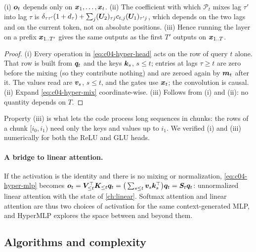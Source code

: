 \begin{proposition}\label{prop:c04-hyper-causal}
(i) $\bm{o}_t$ depends only on $\bm{x}_1,\dots,\bm{x}_t$. (ii) The coefficient with which $\mathcal{P}_t$ mixes
lag $\tau'$ into lag $\tau$ is $\delta_{\tau\tau'}(1+d_\tau)+\sum_{j}(\bm{U}_2)_{\tau j}c_{t,j}(\bm{U}_1)_{\tau' j}$,
which depends on the two lags and on the current token, not on absolute positions. (iii) Hence
running the layer on a prefix $\bm{x}_{1..T'}$ gives the same outputs as the first $T'$ outputs on
$\bm{x}_{1..T}$.
\end{proposition}
\begin{proof}
(i) Every operation in \eqref{eq:c04-hyper-head} acts on the row of query $t$ alone. That row is
built from $\bm{q}_t$ and the keys $\bm{k}_s$, $s\le t$; entries at lags $\tau\ge t$ are zero before the
mixing (so they contribute nothing) and are zeroed again by $\bm{m}_t$ after it. The values read are
$\bm{v}_s$, $s\le t$, and the gates use $\bm{x}_t$; the convolution is causal. (ii) Expand
\eqref{eq:c04-hyper-mix} coordinate-wise. (iii) Follows from (i) and (ii): no quantity depends on
$T$.
\end{proof}

Property (iii) is what lets the code process long sequences in chunks: the rows of a chunk
$[i_0,i_1)$ need only the keys and values up to $i_1$. We verified (i) and (iii) numerically for
both the ReLU and GLU heads.

\paragraph{A bridge to linear attention.}
If the activation is the identity and there is no mixing or normalization,
\eqref{eq:c04-hyper-mlp} becomes $\bm{o}_t=\bm{V}_{\le t}^{\top}\bm{K}_{\le t}\bm{q}_t=\big(\sum_{s\le t}\bm{v}_s\bm{k}_s^{\top}\big)\bm{q}_t
=\bm{S}_t\bm{q}_t$: unnormalized linear attention with the state of \cref{ch:linear}. Softmax attention and
linear attention are thus two choices of activation for the same context-generated MLP, and HyperMLP
explores the space between and beyond them.

\subsection{Algorithms and complexity}

